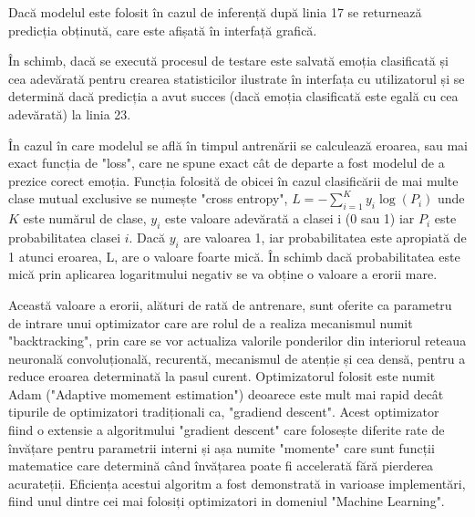 \documentclass[a4paper,12pt]{book}
\begin{document}
		Dacă modelul este folosit în cazul de inferență după linia 17 se returnează predicția obținută, care este afișată în interfață grafică. \par
		În schimb, dacă se execută procesul de testare este salvată emoția clasificată și cea adevărată pentru crearea statisticilor ilustrate în interfața cu utilizatorul și se determină dacă predicția a avut succes (dacă emoția clasificată este egală cu cea adevărată) la linia 23. \par
		În cazul în care modelul se află în timpul antrenării se calculează eroarea, sau mai exact funcția de "loss", care ne spune exact cât de departe a fost modelul de a prezice corect emoția. Funcția folosită de obicei în cazul clasificării de mai multe clase mutual exclusive se numește "cross entropy", $L = -\sum_{i=1}^{K} y_i \log(P_i)$ unde $K$ este numărul de clase, $y_i$ este valoare adevărată a clasei i (0 sau 1) iar $P_i$ este probabilitatea clasei $i$. Dacă $y_i$ are valoarea 1, iar probabilitatea este apropiată de 1 atunci eroarea, L, are o valoare foarte mică. În schimb dacă probabilitatea este mică prin aplicarea logaritmului negativ se va obține o valoare a erorii mare. \par
		Această valoare a erorii, alături de rată de antrenare, sunt oferite ca parametru de intrare unui optimizator care are rolul de a realiza mecanismul numit "backtracking", prin care se vor actualiza valorile ponderilor din interiorul reteaua neuronală convoluțională, recurentă, mecanismul de atenție și cea densă, pentru a reduce eroarea determinată la pasul curent. Optimizatorul folosit este numit Adam \cite{adam} ("Adaptive momement estimation") deoarece este mult mai rapid decât tipurile de optimizatori tradiționali ca, "gradiend descent". Acest optimizator fiind o extensie a algoritmului "gradient descent"	care folosește diferite rate de învățare pentru parametrii interni și așa numite "momente" care sunt funcții matematice care determină când învățarea poate fi accelerată fără pierderea acurateții. Eficiența acestui algoritm a fost demonstrată in varioase implementări, fiind unul dintre cei mai folosiți optimizatori in domeniul "Machine Learning".
		
\end{document}

